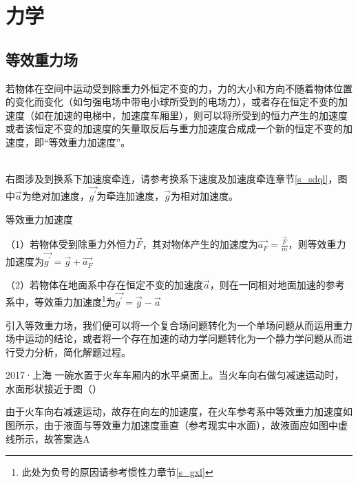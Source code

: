
\chapter{力学}

\section{等效重力场}
若物体在空间中运动受到除重力外恒定不变的力，力的大小和方向不随着物体位置的变化而变化（如匀强电场中带电小球所受到的电场力），或者存在恒定不变的加速度（如在加速的电梯中，加速度车厢里），则可以将所受到的恒力产生的加速度或者该恒定不变的加速度的矢量取反后与重力加速度合成成一个新的恒定不变的加速度，即“等效重力加速度”。

\begin{minipage}[b]{0.4\linewidth}

\end{minipage}
\hfill
\begin{minipage}[b]{0.4\linewidth}

\end{minipage}
~\\
右图涉及到换系下加速度牵连，请参考换系下速度及加速度牵连章节\eqref{s_sdql}，图中$\vec{a}$为绝对加速度，$\vec{g^{\prime}}$为牵连加速度，$\vec{g}$为相对加速度。
\begin{defi}{等效重力加速度}{}

（1）若物体受到除重力外恒力$\vec{F}$，其对物体产生的加速度为$\vec{a_F} = \frac{\vec{F}}{m}$，则等效重力加速度为$\vec{g^{\prime}} = \vec{g} + \vec{a_F}$

（2）若物体在地面系中存在恒定不变的加速度$\vec{a}$，则在一同相对地面加速的参考系中，等效重力加速度\footnote{此处为负号的原因请参考惯性力章节\eqref{s_gxl}}为$\vec{g^{\prime}} = \vec{g} - \vec{a}$
\end{defi}

引入等效重力场，我们便可以将一个复合场问题转化为一个单场问题从而运用重力场中运动的结论，或者将一个存在加速的动力学问题转化为一个静力学问题从而进行受力分析，简化解题过程。

\begin{ep}{2017·上海}{}
一碗水置于火车车厢内的水平桌面上。当火车向右做匀减速运动时，水面形状接近于图（）

\begin{minipage}[b]{0.6\linewidth}
由于火车向右减速运动，故存在向左的加速度，在火车参考系中等效重力加速度如图所示，由于液面与等效重力加速度垂直（参考现实中水面），故液面应如图中虚线所示，故答案选A
\end{minipage}
\hfill
\begin{minipage}[b]{0.3\linewidth}

\end{minipage}
\end{ep}

